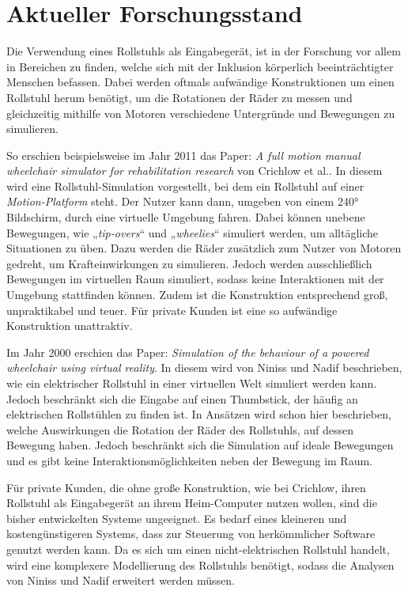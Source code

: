 \chapter{Aktueller Forschungsstand}
Die Verwendung eines Rollstuhls als Eingabegerät, ist in der Forschung vor allem in Bereichen zu finden, welche sich mit der Inklusion körperlich beeinträchtigter Menschen befassen.
Dabei werden oftmals aufwändige Konstruktionen um einen Rollstuhl herum benötigt, um die Rotationen der Räder zu messen und gleichzeitig mithilfe von Motoren verschiedene Untergründe und Bewegungen zu simulieren.

So erschien beispielsweise im Jahr 2011 das Paper: \textit{A full motion manual\\wheelchair simulator for rehabilitation research} von Crichlow et al.\cite{crichlowFullMotionManual2011}.
In diesem wird eine Rollstuhl-Simulation vorgestellt, bei dem ein Rollstuhl auf einer \textit{Motion-Platform} steht.
Der Nutzer kann dann, umgeben von einem 240° Bildschirm, durch eine virtuelle Umgebung fahren.
Dabei können unebene Bewegungen, wie „\textit{tip-overs}“ und „\textit{wheelies}“ simuliert werden, um alltägliche Situationen zu üben\cite{crichlowFullMotionManual2011}.
Dazu werden die Räder zusätzlich zum Nutzer von Motoren gedreht, um Krafteinwirkungen zu simulieren.
Jedoch werden ausschließlich Bewegungen im virtuellen Raum simuliert, sodass keine Interaktionen mit der Umgebung stattfinden können.
Zudem ist die Konstruktion entsprechend groß, unpraktikabel und teuer.
Für private Kunden ist eine so aufwändige Konstruktion unattraktiv.

Im Jahr 2000 erschien das Paper: \textit{Simulation of the behaviour of a powered wheelchair using virtual reality}\cite{ninissSimulationBehaviourPowered2000}.
In diesem wird von Niniss und Nadif beschrieben, wie ein elektrischer Rollstuhl in einer virtuellen Welt simuliert werden kann.
Jedoch beschränkt sich die Eingabe auf einen Thumbstick, der häufig an elektrischen Rollstühlen zu finden ist.
In Ansätzen wird schon hier beschrieben, welche Auswirkungen die Rotation der Räder des Rollstuhls, auf dessen Bewegung haben.
Jedoch beschränkt sich die Simulation auf ideale Bewegungen und es gibt keine Interaktionsmöglichkeiten neben der Bewegung im Raum.

Für private Kunden, die ohne große Konstruktion, wie bei Crichlow, ihren Rollstuhl als Eingabegerät an ihrem Heim-Computer nutzen wollen, sind die bisher entwickelten Systeme ungeeignet.
Es bedarf eines kleineren und kostengünstigeren Systems, dass zur Steuerung von herkömmlicher Software genutzt werden kann.
Da es sich um einen nicht-elektrischen Rollstuhl handelt, wird eine komplexere Modellierung des Rollstuhls benötigt, sodass die Analysen von Niniss und Nadif erweitert werden müssen.
